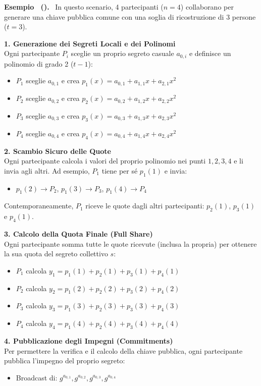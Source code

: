 \documentclass[a4paper, 11pt]{article}
\newenvironment{example}[1][]{
  \par\noindent\textbf{Esempio%
  \if\relax\detokenize{#1}\relax\else\ (\textbf{#1})\fi.}\ }{}
\begin{document}
\begin{example}
    In questo scenario, 4 partecipanti ($n=4$) collaborano per generare una chiave pubblica comune con una soglia di ricostruzione di 3 persone ($t=3$).

    \textbf{1. Generazione dei Segreti Locali e dei Polinomi} \\
    Ogni partecipante $P_i$ sceglie un proprio segreto casuale $a_{0,i}$ e definisce un polinomio di grado 2 ($t-1$):
    \begin{itemize}
        \item $P_1$ sceglie $a_{0,1}$ e crea $p_1(x) = a_{0,1} + a_{1,1}x + a_{2,1}x^2$
        \item $P_2$ sceglie $a_{0,2}$ e crea $p_2(x) = a_{0,2} + a_{1,2}x + a_{2,2}x^2$
        \item $P_3$ sceglie $a_{0,3}$ e crea $p_3(x) = a_{0,3} + a_{1,3}x + a_{2,3}x^2$
        \item $P_4$ sceglie $a_{0,4}$ e crea $p_4(x) = a_{0,4} + a_{1,4}x + a_{2,4}x^2$
    \end{itemize}

    \textbf{2. Scambio Sicuro delle Quote} \\
    Ogni partecipante calcola i valori del proprio polinomio nei punti $1, 2, 3, 4$ e li invia agli altri. Ad esempio, $P_1$ tiene per sé $p_1(1)$ e invia:
    \begin{itemize}
        \item $p_1(2) \to P_2$, \quad $p_1(3) \to P_3$, \quad $p_1(4) \to P_4$
    \end{itemize}
    Contemporaneamente, $P_1$ riceve le quote dagli altri partecipanti: $p_2(1)$, $p_3(1)$ e $p_4(1)$.

    \textbf{3. Calcolo della Quota Finale (Full Share)} \\
    Ogni partecipante somma tutte le quote ricevute (inclusa la propria) per ottenere la sua quota del segreto collettivo $s$:
    \begin{itemize}
        \item $P_1$ calcola $y_1 = p_1(1) + p_2(1) + p_3(1) + p_4(1)$
        \item $P_2$ calcola $y_2 = p_1(2) + p_2(2) + p_3(2) + p_4(2)$
        \item $P_3$ calcola $y_3 = p_1(3) + p_2(3) + p_3(3) + p_4(3)$
        \item $P_4$ calcola $y_4 = p_1(4) + p_2(4) + p_3(4) + p_4(4)$
    \end{itemize}

    \textbf{4. Pubblicazione degli Impegni (Commitments)} \\
    Per permettere la verifica e il calcolo della chiave pubblica, ogni partecipante pubblica l'impegno del proprio segreto:
    \begin{itemize}
        \item Broadcast di: $g^{a_{0,1}}, g^{a_{0,2}}, g^{a_{0,3}}, g^{a_{0,4}}$
    \end{itemize}


\end{example}
\end{document}

